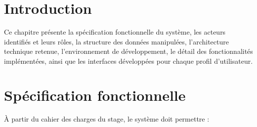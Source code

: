 
\section{Introduction}

Ce chapitre présente la spécification fonctionnelle du système, les acteurs
identifiés et leurs rôles, la structure des données manipulées, l'architecture
technique retenue, l'environnement de développement, le détail des
fonctionnalités implémentées, ainsi que les interfaces développées pour
chaque profil d'utilisateur.

\section{Spécification fonctionnelle}

À partir du cahier des charges du stage, le système doit permettre :

